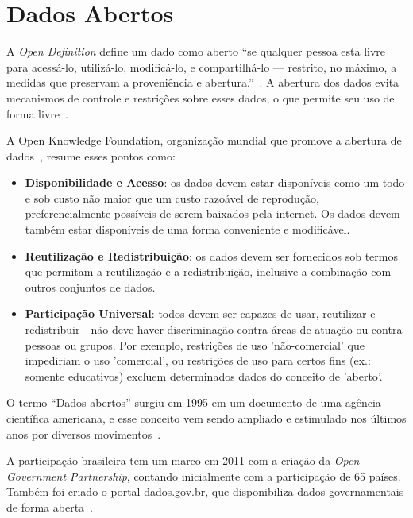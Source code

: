 \chapter{Dados Abertos}

A \emph{Open Definition} define um dado como aberto \enquote{se qualquer pessoa esta livre para acessá-lo, utilizá-lo, modificá-lo, e compartilhá-lo — restrito, no máximo, a medidas que preservam a proveniência e abertura.}~\cite{opendefinition}. A abertura dos dados evita mecanismos de controle e restrições sobre esses dados, o que permite seu uso de forma livre~\cite{seijiconectados}.

A Open Knowledge Foundation, organização mundial que promove a abertura de dados~\cite{openknowledge}, resume esses pontos como:

\begin{itemize}
\item \textbf{Disponibilidade e Acesso}: os dados devem estar disponíveis como um todo e sob custo não maior que um custo razoável de reprodução, preferencialmente possíveis de serem baixados pela internet. Os dados devem também estar disponíveis de uma forma conveniente e modificável.

\item \textbf{Reutilização e Redistribuição}: os dados devem ser fornecidos sob termos que permitam a reutilização e a redistribuição, inclusive a combinação com outros conjuntos de dados.

\item \textbf{Participação Universal}: todos devem ser capazes de usar, reutilizar e redistribuir - não deve haver discriminação contra áreas de atuação ou contra pessoas ou grupos. Por exemplo, restrições de uso 'não-comercial' que impediriam o uso 'comercial', ou restrições de uso para certos fins (ex.: somente educativos) excluem determinados dados do conceito de 'aberto'.
\end{itemize}

O termo \enquote{Dados abertos} surgiu em 1995 em um documento de uma agência científica americana, e esse conceito vem sendo ampliado e estimulado nos últimos anos por diversos movimentos~\cite{seijiconectados}. 

A participação brasileira tem um marco em 2011 com a criação da \emph{Open Government Partnership}, contando inicialmente com a participação de 65 países. Também foi criado o portal dados.gov.br, que disponibiliza dados governamentais de forma aberta~\cite{seijiconectados}.


